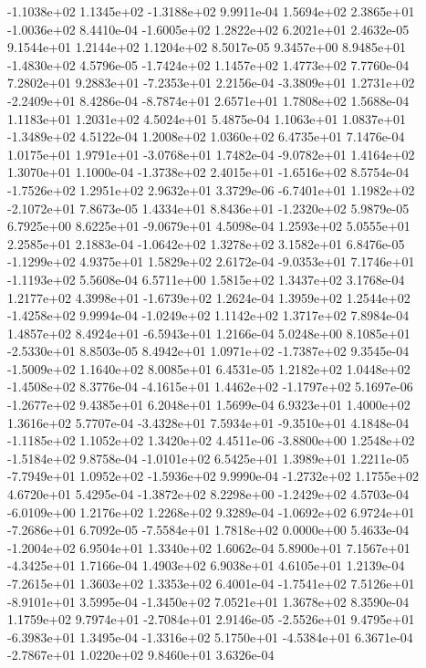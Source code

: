 -1.1038e+02  1.1345e+02 -1.3188e+02  9.9911e-04
 1.5694e+02  2.3865e+01 -1.0036e+02  8.4410e-04
-1.6005e+02  1.2822e+02  6.2021e+01  2.4632e-05
9.1544e+01 1.2144e+02 1.1204e+02  8.5017e-05
 9.3457e+00  8.9485e+01 -1.4830e+02  4.5796e-05
-1.7424e+02  1.1457e+02  1.4773e+02  7.7760e-04
 7.2802e+01  9.2883e+01 -7.2353e+01  2.2156e-04
-3.3809e+01  1.2731e+02 -2.2409e+01  8.4286e-04
-8.7874e+01  2.6571e+01  1.7808e+02  1.5688e-04
1.1183e+01 1.2031e+02 4.5024e+01  5.4875e-04
 1.1063e+01  1.0837e+01 -1.3489e+02  4.5122e-04
1.2008e+02 1.0360e+02 6.4735e+01  7.1476e-04
 1.0175e+01  1.9791e+01 -3.0768e+01  1.7482e-04
-9.0782e+01  1.4164e+02  1.3070e+01  1.1000e-04
-1.3738e+02  2.4015e+01 -1.6516e+02  8.5754e-04
-1.7526e+02  1.2951e+02  2.9632e+01  3.3729e-06
-6.7401e+01  1.1982e+02 -2.1072e+01  7.8673e-05
 1.4334e+01  8.8436e+01 -1.2320e+02  5.9879e-05
 6.7925e+00  8.6225e+01 -9.0679e+01  4.5098e-04
1.2593e+02 5.0555e+01 2.2585e+01  2.1883e-04
-1.0642e+02  1.3278e+02  3.1582e+01  6.8476e-05
-1.1299e+02  4.9375e+01  1.5829e+02  2.6172e-04
-9.0353e+01  7.1746e+01 -1.1193e+02  5.5608e-04
6.5711e+00 1.5815e+02 1.3437e+02  3.1768e-04
 1.2177e+02  4.3998e+01 -1.6739e+02  1.2624e-04
 1.3959e+02  1.2544e+02 -1.4258e+02  9.9994e-04
-1.0249e+02  1.1142e+02  1.3717e+02  7.8984e-04
 1.4857e+02  8.4924e+01 -6.5943e+01  1.2166e-04
 5.0248e+00  8.1085e+01 -2.5330e+01  8.8503e-05
 8.4942e+01  1.0971e+02 -1.7387e+02  9.3545e-04
-1.5009e+02  1.1640e+02  8.0085e+01  6.4531e-05
 1.2182e+02  1.0448e+02 -1.4508e+02  8.3776e-04
-4.1615e+01  1.4462e+02 -1.1797e+02  5.1697e-06
-1.2677e+02  9.4385e+01  6.2048e+01  1.5699e-04
6.9323e+01 1.4000e+02 1.3616e+02  5.7707e-04
-3.4328e+01  7.5934e+01 -9.3510e+01  4.1848e-04
-1.1185e+02  1.1052e+02  1.3420e+02  4.4511e-06
-3.8800e+00  1.2548e+02 -1.5184e+02  9.8758e-04
-1.0101e+02  6.5425e+01  1.3989e+01  1.2211e-05
-7.7949e+01  1.0952e+02 -1.5936e+02  9.9990e-04
-1.2732e+02  1.1755e+02  4.6720e+01  5.4295e-04
-1.3872e+02  8.2298e+00 -1.2429e+02  4.5703e-04
-6.0109e+00  1.2176e+02  1.2268e+02  9.3289e-04
-1.0692e+02  6.9724e+01 -7.2686e+01  6.7092e-05
-7.5584e+01  1.7818e+02  0.0000e+00  5.4633e-04
-1.2004e+02  6.9504e+01  1.3340e+02  1.6062e-04
 5.8900e+01  7.1567e+01 -4.3425e+01  1.7166e-04
1.4903e+02 6.9038e+01 4.6105e+01  1.2139e-04
-7.2615e+01  1.3603e+02  1.3353e+02  6.4001e-04
-1.7541e+02  7.5126e+01 -8.9101e+01  3.5995e-04
-1.3450e+02  7.0521e+01  1.3678e+02  8.3590e-04
 1.1759e+02  9.7974e+01 -2.7084e+01  2.9146e-05
-2.5526e+01  9.4795e+01 -6.3983e+01  1.3495e-04
-1.3316e+02  5.1750e+01 -4.5384e+01  6.3671e-04
-2.7867e+01  1.0220e+02  9.8460e+01  3.6326e-04
